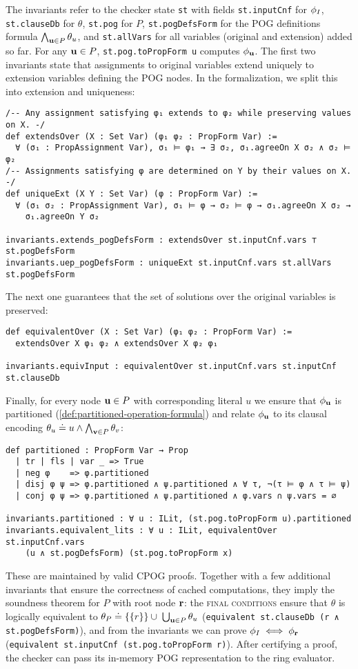 The invariants refer to the checker state \lstinline{st} with fields \lstinline{st.inputCnf} for $\phi_I$, \lstinline{st.clauseDb} for $\theta$, \lstinline{st.pog} for $P$, \lstinline{st.pogDefsForm} for the POG definitions formula $\bigwedge_{\mathbf{u}\in P}\theta_u$, and \lstinline{st.allVars} for all variables (original and extension) added so far. For any $\mathbf{u}\in P$, \lstinline{st.pog.toPropForm u} computes $\phi_{\mathbf{u}}$. The first two invariants state that assignments to original variables extend uniquely to extension variables defining the POG nodes. In the formalization, we split this into extension and uniqueness:
\begin{lstlisting}
/-- Any assignment satisfying φ₁ extends to φ₂ while preserving values on X. -/
def extendsOver (X : Set Var) (φ₁ φ₂ : PropForm Var) :=
  ∀ (σ₁ : PropAssignment Var), σ₁ ⊨ φ₁ → ∃ σ₂, σ₁.agreeOn X σ₂ ∧ σ₂ ⊨ φ₂
/-- Assignments satisfying φ are determined on Y by their values on X. -/
def uniqueExt (X Y : Set Var) (φ : PropForm Var) :=
  ∀ (σ₁ σ₂ : PropAssignment Var), σ₁ ⊨ φ → σ₂ ⊨ φ → σ₁.agreeOn X σ₂ →
    σ₁.agreeOn Y σ₂

invariants.extends_pogDefsForm : extendsOver st.inputCnf.vars ⊤ st.pogDefsForm
invariants.uep_pogDefsForm : uniqueExt st.inputCnf.vars st.allVars st.pogDefsForm
\end{lstlisting}
The next one guarantees that the set of solutions over the original variables is preserved:
\begin{lstlisting}
def equivalentOver (X : Set Var) (φ₁ φ₂ : PropForm Var) :=
  extendsOver X φ₁ φ₂ ∧ extendsOver X φ₂ φ₁

invariants.equivInput : equivalentOver st.inputCnf.vars st.inputCnf st.clauseDb
\end{lstlisting}
Finally, for every node $\mathbf{u}\in P$ with corresponding literal $u$ we ensure that $\phi_{\mathbf{u}}$ is partitioned (\cref{def:partitioned-operation-formula}) and relate $\phi_{\mathbf{u}}$ to its clausal encoding $\theta_u \doteq u \wedge \bigwedge_{\mathbf{v}\in P}\theta_v$:
\begin{lstlisting}
def partitioned : PropForm Var → Prop
  | tr | fls | var _ => True
  | neg φ    => φ.partitioned
  | disj φ ψ => φ.partitioned ∧ ψ.partitioned ∧ ∀ τ, ¬(τ ⊨ φ ∧ τ ⊨ ψ)
  | conj φ ψ => φ.partitioned ∧ ψ.partitioned ∧ φ.vars ∩ ψ.vars = ∅

invariants.partitioned : ∀ u : ILit, (st.pog.toPropForm u).partitioned
invariants.equivalent_lits : ∀ u : ILit, equivalentOver st.inputCnf.vars
    (u ∧ st.pogDefsForm) (st.pog.toPropForm x)
\end{lstlisting}
These are maintained by valid CPOG proofs. Together with a few additional invariants
that ensure the correctness of cached computations, they imply the soundness theorem for $P$ with root
node $\mathbf{r}$: the \textsc{final conditions} ensure that $\theta$ is logically equivalent to
$\theta_P \doteq \{\{r\}\} \cup \; \bigcup_{\mathbf{u} \in P} \theta_{u}$
(\lstinline{equivalent st.clauseDb (r ∧ st.pogDefsForm)}), and from the invariants we can prove
$\phi_I \iff \phi_{\mathbf{r}}$ (\lstinline{equivalent st.inputCnf (st.pog.toPropForm r)}).
After certifying a proof, the checker can pass its in-memory POG representation to the ring evaluator.

